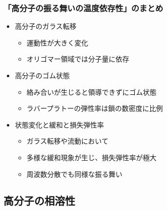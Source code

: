 \documentclass[12pt, dvipdfmx]{beamer}
\begin{document}
\begin{frame}
	\frametitle{「高分子の振る舞いの温度依存性」のまとめ}
        \begin{boxnote}
            \vspace{-3mm}
            \begin{itemize}
                \item 高分子のガラス転移
                    \begin{itemize}
                        \item 運動性が大きく変化
                        \item オリゴマー領域では分子量に依存
                    \end{itemize} 
                \item 高分子のゴム状態
                    \begin{itemize}
                        \item 絡み合いが生じると領導できずにゴム状態
                        \item ラバープラトーの弾性率は鎖の数密度に比例
                    \end{itemize} 
                \item 状態変化と緩和と損失弾性率
                    \begin{itemize}
                        \item ガラス転移や流動において
                        \item 多様な緩和現象が生じ、損失弾性率が極大
                        \item 周波数分散でも同様な振る舞い
                    \end{itemize}
            \end{itemize}
        \end{boxnote}
\end{frame}

\subsection{高分子の相溶性}
\end{document}

